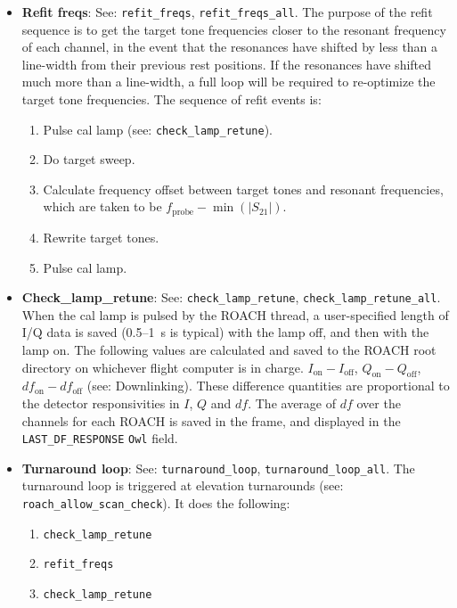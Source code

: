 \begin{itemize}[leftmargin=*,label={}]
\item \textbf{Refit freqs}: See: \texttt{refit\_freqs}, \texttt{refit\_freqs\_all}. The purpose of the refit sequence is to get the target tone frequencies closer to the resonant frequency of each channel, in the event that the resonances have shifted by less than a line-width from their previous rest positions. If the resonances have shifted much more than a line-width, a full loop will be required to re-optimize the target tone frequencies. The sequence of refit events is:
\begin{enumerate}
  \item Pulse cal lamp (see: \texttt{check\_lamp\_retune}).
  \item Do target sweep.
  \item Calculate frequency offset between target tones and resonant frequencies, which are taken to be $f_{\mathrm{probe}} - \min(|S_{21}|)$.
  \item Rewrite target tones.
  \item Pulse cal lamp.
\end{enumerate}

\item \textbf{Check\_lamp\_retune}: See: \texttt{check\_lamp\_retune}, \texttt{check\_lamp\_retune\_all}. When the cal lamp is pulsed by the ROACH thread, a user-specified length of I/Q data is saved (0.5--1~s is typical) with the lamp off, and then with the lamp on. The following values are calculated and saved to the ROACH root directory on whichever flight computer is in charge. $I_{\mathrm{on}} - I_{\mathrm{off}}$, $Q_{\mathrm{on}} - Q_{\mathrm{off}}$, $df_{\mathrm{on}} - df_{\mathrm{off}}$ (see: Downlinking). These difference quantities are proportional to the detector responsivities in $I$, $Q$ and $df$. The average of $df$ over the channels for each ROACH is saved in the frame, and displayed in the \texttt{LAST\_DF\_RESPONSE} \texttt{Owl} field.

\item \textbf{Turnaround loop}: See: \texttt{turnaround\_loop}, \texttt{turnaround\_loop\_all}. The turnaround loop is triggered at elevation turnarounds (see: \texttt{roach\_allow\_scan\_check}). It does the following:
\begin{enumerate}
  \item \texttt{check\_lamp\_retune}
  \item \texttt{refit\_freqs}
  \item \texttt{check\_lamp\_retune}
\end{enumerate}


\end{itemize}
